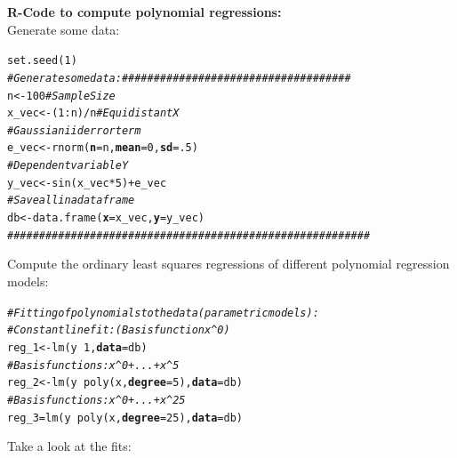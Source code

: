 \documentclass[14pt]{extreport}\usepackage[]{graphicx}\usepackage[]{xcolor}
\makeatletter
\newcommand{\hlnum}[1]{\textcolor[rgb]{0.69,0.494,0}{#1}}%
\newcommand{\hlcom}[1]{\textcolor[rgb]{0.514,0.506,0.514}{\textit{#1}}}%
\newcommand{\hlopt}[1]{\textcolor[rgb]{0,0,0}{#1}}%
\newcommand{\hlstd}[1]{\textcolor[rgb]{0,0,0}{#1}}%
\newcommand{\hlkwb}[1]{\textcolor[rgb]{0,0.341,0.682}{#1}}%
\newcommand{\hlkwc}[1]{\textcolor[rgb]{0,0,0}{\textbf{#1}}}%
\newcommand{\hlkwd}[1]{\textcolor[rgb]{0.004,0.004,0.506}{#1}}%
\newenvironment{kframe}{%
 \def\at@end@of@kframe{}%
 \ifinner\ifhmode%
  \def\at@end@of@kframe{\end{minipage}}%
  \begin{minipage}{\columnwidth}%
 \fi\fi%
 \def\FrameCommand##1{\hskip\@totalleftmargin \hskip-\fboxsep
 \colorbox{shadecolor}{##1}\hskip-\fboxsep
     \hskip-\linewidth \hskip-\@totalleftmargin \hskip\columnwidth}%
 \MakeFramed {\advance\hsize-\width
   \@totalleftmargin\z@ \linewidth\hsize
   \@setminipage}}%
 {\par\unskip\endMakeFramed%
 \at@end@of@kframe}
\newenvironment{knitrout}{}{} %
\makeatother
\begin{document}
\textbf{R-Code to compute polynomial regressions:}\\
Generate some data:
\begin{knitrout}
\color{fgcolor}\begin{kframe}
\begin{alltt}
\hlkwd{set.seed}\hlstd{(}\hlnum{1}\hlstd{)}
\hlcom{# Generate some data: ####################################}
\hlstd{n}      \hlkwb{<-} \hlnum{100}     \hlcom{# Sample Size}
\hlstd{x_vec}  \hlkwb{<-} \hlstd{(}\hlnum{1}\hlopt{:}\hlstd{n)}\hlopt{/}\hlstd{n} \hlcom{# Equidistant X }
\hlcom{# Gaussian iid error term }
\hlstd{e_vec}  \hlkwb{<-} \hlkwd{rnorm}\hlstd{(}\hlkwc{n} \hlstd{= n,} \hlkwc{mean} \hlstd{=} \hlnum{0}\hlstd{,} \hlkwc{sd} \hlstd{=} \hlnum{.5}\hlstd{)}
\hlcom{# Dependent variable Y}
\hlstd{y_vec}  \hlkwb{<-}  \hlkwd{sin}\hlstd{(x_vec} \hlopt{*} \hlnum{5}\hlstd{)} \hlopt{+} \hlstd{e_vec}
\hlcom{# Save all in a dataframe}
\hlstd{db}     \hlkwb{<-}  \hlkwd{data.frame}\hlstd{(}\hlkwc{x}\hlstd{=x_vec,}\hlkwc{y}\hlstd{=y_vec)}
\hlcom{#########################################################}
\end{alltt}
\end{kframe}
\end{knitrout}
Compute the ordinary least squares regressions of different polynomial regression models:
\begin{knitrout}
\color{fgcolor}\begin{kframe}
\begin{alltt}
\hlcom{# Fitting of polynomials to the data (parametric models):}
\hlcom{# Constant line fit: (Basis function x^0)}
\hlstd{reg_1} \hlkwb{<-} \hlkwd{lm}\hlstd{(y} \hlopt{~} \hlnum{1}\hlstd{,} \hlkwc{data}\hlstd{=db)}
\hlcom{# Basis functions: x^0 + ... + x^5}
\hlstd{reg_2} \hlkwb{<-} \hlkwd{lm}\hlstd{(y} \hlopt{~} \hlkwd{poly}\hlstd{(x,} \hlkwc{degree} \hlstd{=} \hlnum{5}\hlstd{),} \hlkwc{data}\hlstd{=db)}
\hlcom{# Basis functions: x^0 + ... + x^25}
\hlstd{reg_3} \hlkwb{=} \hlkwd{lm}\hlstd{(y} \hlopt{~} \hlkwd{poly}\hlstd{(x,} \hlkwc{degree} \hlstd{=} \hlnum{25}\hlstd{),} \hlkwc{data}\hlstd{=db)}
\end{alltt}
\end{kframe}
\end{knitrout}
Take a look at the fits:
\end{document}
